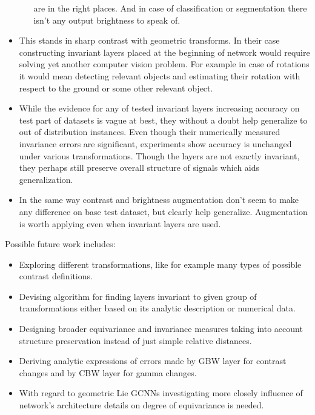 \begin{itemize}
\begin{itemize}
                are in the right places. And in case of classification or
                segmentation there isn't any output brightness to speak of.
        \end{itemize}
    \item This stands in sharp contrast with geometric transforms. In their case
        constructing invariant layers placed at the beginning of network would require
        solving yet another computer vision problem. For example in case of
        rotations it would mean detecting relevant objects and estimating their
        rotation with respect to the ground or some other relevant object.
    \item While the evidence for any of tested invariant layers increasing
        accuracy on test part of datasets is vague at
        best, they without a doubt help generalize to out of distribution
        instances. Even though their numerically measured invariance errors are
        significant, experiments show accuracy is unchanged under various
        transformations. Though the layers are not exactly invariant, they
        perhaps still preserve overall structure of signals which aids
        generalization.
    \item In the same way contrast and brightness augmentation don't seem to
        make any difference on base test dataset, but clearly help generalize.
        Augmentation is worth applying even when invariant layers are used.
\end{itemize}

Possible future work includes:
\begin{itemize}
    \item Exploring different transformations, like for example many types of
        possible contrast definitions.
    \item Devising algorithm for finding layers invariant to given group of
        transformations either based on its analytic description or numerical
        data.
    \item Designing broader equivariance and invariance measures taking into
        account structure preservation instead of just simple relative distances.
    \item Deriving analytic expressions of errors made by GBW layer for contrast
        changes and by CBW layer for gamma changes.
    \item With regard to geometric Lie GCNNs investigating more closely influence
        of network's architecture details on degree of equivariance is needed.
\end{itemize}
